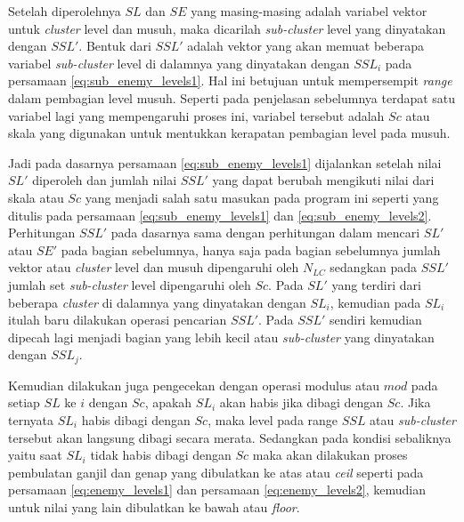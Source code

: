 Setelah diperolehnya $SL$ dan $SE$ yang masing-masing adalah variabel vektor untuk \textit{cluster} level dan musuh, maka dicarilah \textit{sub-cluster} level yang dinyatakan dengan $SSL'$. Bentuk dari $SSL'$ adalah vektor yang akan memuat beberapa variabel \textit{sub-cluster} level di dalamnya yang dinyatakan dengan $SSL_{i}$ pada persamaan \ref{eq:sub_enemy_levels1}. Hal ini betujuan untuk mempersempit \textit{range} dalam pembagian level musuh. Seperti pada penjelasan sebelumnya terdapat satu variabel lagi yang mempengaruhi proses ini, variabel tersebut adalah $Sc$ atau skala yang digunakan untuk mentukkan kerapatan pembagian level pada musuh. 
\vspace{1ex}

Jadi pada dasarnya persamaan \ref{eq:sub_enemy_levels1} dijalankan setelah nilai $SL'$ diperoleh dan jumlah nilai $SSL'$ yang dapat berubah mengikuti nilai dari skala atau $Sc$ yang menjadi salah satu masukan pada program ini seperti yang ditulis pada persamaan \ref{eq:sub_enemy_levels1} dan \ref{eq:sub_enemy_levels2}. Perhitungan $SSL'$ pada dasarnya sama dengan perhitungan dalam mencari $SL'$ atau $SE'$ pada bagian sebelumnya, hanya saja pada bagian sebelumnya jumlah vektor atau \textit{cluster} level dan musuh dipengaruhi oleh $N_{LC}$ sedangkan pada $SSL'$ jumlah set \textit{sub-cluster} level dipengaruhi oleh $Sc$. Pada $SL'$ yang terdiri dari beberapa \textit{cluster} di dalamnya yang dinyatakan dengan $SL_{i}$, kemudian pada $SL_{i}$ itulah baru dilakukan operasi pencarian $SSL'$. Pada $SSL'$ sendiri kemudian dipecah lagi menjadi bagian yang lebih kecil atau \textit{sub-cluster} yang dinyatakan dengan $SSL_{j}$.
\vspace{1ex}

Kemudian dilakukan juga pengecekan dengan operasi modulus atau $mod$ pada setiap $SL$ ke $i$ dengan $Sc$, apakah $SL_{i}$ akan habis jika dibagi dengan $Sc$. Jika ternyata $SL_{i}$ habis dibagi dengan $Sc$, maka level pada range $SSL$ atau \textit{sub-cluster} tersebut akan langsung dibagi secara merata. Sedangkan pada kondisi sebaliknya yaitu saat $SL_{i}$ tidak habis dibagi dengan $Sc$ maka akan dilakukan proses pembulatan ganjil dan genap yang dibulatkan ke atas atau \textit{ceil} seperti pada persamaan \ref{eq:enemy_levels1} dan persamaan \ref{eq:enemy_levels2}, kemudian untuk nilai yang lain dibulatkan ke bawah atau \textit{floor}.
\vspace{1ex}

